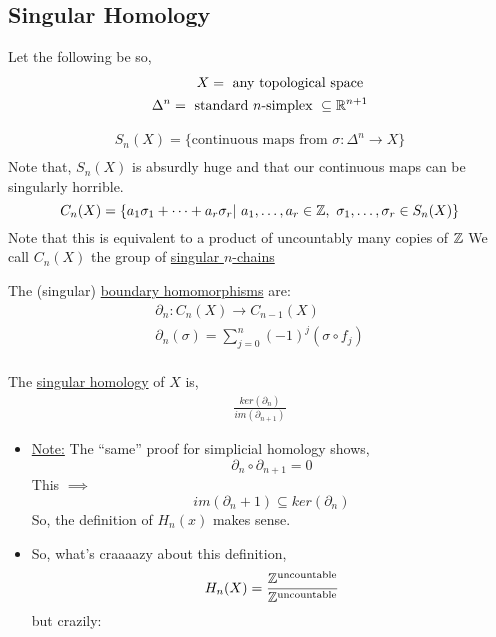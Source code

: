 \documentclass[../notes.tex]{subfiles}
\begin{document}
\subsection{Singular Homology}
Let the following be so,
\begin{align*}
    X=\text{ any topological space }\\
    \Delta^n=\text{ standard $n$-simplex }\subseteq \mathbb{R}^{n+1}\\
\end{align*}
\begin{definition}
    \begin{align*}
        S_n(X)=\{\text{continuous maps from $\sigma:\Delta^n\rightarrow X$}\}\\
    \end{align*}
    Note that, $S_n(X)$ is absurdly huge and that our continuous maps can be 
    singularly horrible.
    \[
        C_n(X)=\{a_1\sigma_1+\dots+a_r\sigma_r|\ a_1,\dots,a_r\in \Z,\ \sigma_1,\dots,\sigma_r\in S_n(X)\}
    \]
    Note that this is equivalent to a product of uncountably many copies of $\mathbb{Z}$
    We call $C_n(X)$ the group of \underline{singular $n$-chains}
\end{definition}
\begin{definition}
    The (singular) \underline{boundary homomorphisms} are:
    \begin{align*}
        \partial_n:C_n(X)\rightarrow C_{n-1}(X)\\
        \partial_n(\sigma)=\sum_{j=0}^n(-1)^{j}(\sigma\circ  f_j)\\
    \end{align*}
\end{definition}
\begin{definition}
    The \underline{singular homology} of $X$ is,
    \begin{align*}
        \frac{ker(\partial_n)}{im(\partial_{n+1})}
    \end{align*}
\end{definition}
\begin{itemize}
    \item \underline{Note:} The ``same'' proof for simplicial homology shows,
        \[
            \partial_n\circ\partial_{n+1}=0
        \]
        This $\implies$
        \[
            im(\partial_n+1)\subseteq ker(\partial_n)
        \]
        So, the definition of $H_n(x)$ makes sense.
    \item So, what's craaaazy about this definition,
        \[
            H_n(X)=\frac{\mathbb{Z}^{\text{uncountable}}}{\mathbb{Z}^{\text{uncountable}}}
        \]
        but crazily:
\end{itemize}
\end{document}

